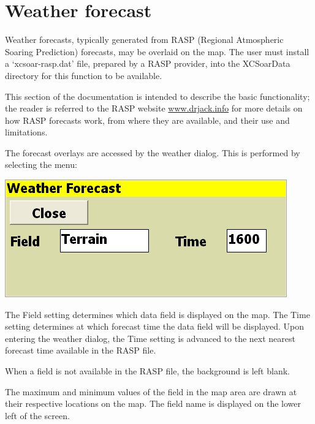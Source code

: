 \documentclass[a4paper,12pt]{refrep}
\begin{document}
\section{Weather forecast}

Weather forecasts, typically generated from RASP (Regional Atmospheric
Soaring Prediction) forecasts, may be overlaid on the map.  The user
must install a `xcsoar-rasp.dat' file, prepared by a RASP provider,
into the XCSoarData directory for this function to be available.

This section of the documentation is intended to describe the basic
functionality; the reader is referred to the RASP website
\url{www.drjack.info} for more details on how RASP forecasts work, from where they are available, and their use and limitations.

The forecast overlays are accessed by the weather dialog.  This is
performed by selecting the menu:
\begin{quote}
\blink{}\blink{}
\end{quote}

\begin{center}
\includegraphics[angle=0,width=0.5\linewidth,keepaspectratio='true']{figures/dialog-weather.png}
\end{center}

The Field setting determines which data field is displayed on the map.
The Time setting determines at which forecast time the data field will
be displayed.  Upon entering the weather dialog, the Time setting is
advanced to the next nearest forecast time available in the RASP file.

When a field is not available in the RASP file, the background is left blank.

The maximum and minimum values of the field in the map area are drawn
at their respective locations on the map.  The field name is displayed
on the lower left of the screen.
\end{document}
